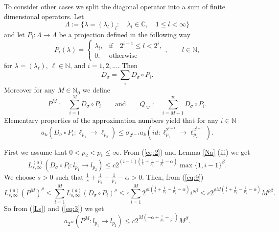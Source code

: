 \documentclass[12pt]{article}
\newcommand{\N}{{\mathbb N}}
\newcommand{\C}{{\mathbb C}}
\begin{document}
To consider other cases we split the diagonal operator into a sum of finite dimensional operators. 
  Let
\begin{displaymath}
	\Lambda:=\{\lambda=(\lambda_l)_l:\quad \lambda_l\in\C,\quad 1\leq l<\infty\}
\end{displaymath}
and let $P_i: \Lambda\rightarrow\Lambda$ be a projection defined in the following way
\begin{displaymath}
	P_i(\lambda)=
	\left\{ \begin{array}{ll} \lambda_l, & {\mathrm{if}\quad 2^{i-1}\leq l <2^i,} \\ 0, &{\mathrm{otherwise}}\end{array}\right.
	, \qquad l\in\N,
\end{displaymath}
for $\lambda=(\lambda_\ell)$, $\ell\in \N$,  and  $i=1,2,...$. Then
\begin{displaymath}
	D_\sigma=\sum_i D_\sigma \circ P_i.
\end{displaymath} 
Moreover for any  $M\in\N_0$ we define 
\begin{displaymath}\label{P-Q}
	P^M:=\sum_{i=1}^{M}D_\sigma\circ P_i \qquad \mathrm{and} \qquad Q_M:=\sum_{i=M+1}^{\infty}D_\sigma\circ P_i.
\end{displaymath} 
Elementary properties of the approximation numbers  yield that for any $i\in\N$
\begin{equation}
	a_k(D_\sigma \circ P_i: \ell_{p_1}\rightarrow \ell_{p_2})\leq \sigma_{2^{i-1}}a_k(id:\ell_{p_1}^{2^{i-1}}\rightarrow \ell_{p_2}^{2^{i-1}}).
	\label{eq:2}
\end{equation}

First we assume that $0< p_2< p_1 \leq\infty$.  From (\ref{eq:2}) and  Lemma \ref{Na} (iii)  we get
\begin{equation}
	L_{s,\infty}^{(a)}(D_\sigma\circ P_i: l_{p_1}\rightarrow l_{p_2})\leq c 2^{(i-1)(\frac{1}{s} + \frac{1}{p_2}-\frac{1}{p_1}-\alpha)}\max\{1,i-1 \}^\beta.
	\label{eq:9}
\end{equation} 
We choose $s>0$ such that $\frac{1}{s} + \frac{1}{p_2}-\frac{1}{p_1}-\alpha >0$. Then, from (\ref{eq:9})
\begin{equation}\label{eq:3}
	L_{s,\infty}^{(a)}(P^M)^\rho\leq \sum_{i=1}^{M}L_{s,\infty}^{(a)}(D_\sigma\circ P_i)^\rho\leq c\sum_{i=1}^{M} 2^{\rho i(\frac{1}{s} + \frac{1}{p_2}-\frac{1}{p_1}-\alpha)}i^{\rho\beta}\leq c2^{\rho M(\frac{1}{s} +\frac{1}{p_2}-\frac{1}{p_1}-\alpha)}M^{\rho\beta}.
\end{equation}
So from  (\ref{Ls}) and (\ref{eq:3}) we get 
\begin{equation}\label{eq:4}
	a_{2^M}(P^M:l_{p_1}\rightarrow l_{p_2})\leq c 2^{ M(-\alpha+ \frac{1}{p_2}-\frac{1}{p_1})}M^\beta.	
\end{equation}
\end{document}
